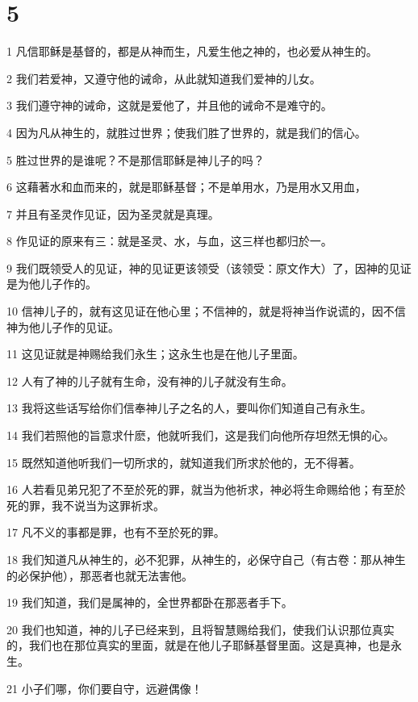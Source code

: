 \chapter{5}

\par 1 凡信耶稣是基督的，都是从神而生，凡爱生他之神的，也必爱从神生的。
\par 2 我们若爱神，又遵守他的诫命，从此就知道我们爱神的儿女。
\par 3 我们遵守神的诫命，这就是爱他了，并且他的诫命不是难守的。
\par 4 因为凡从神生的，就胜过世界；使我们胜了世界的，就是我们的信心。
\par 5 胜过世界的是谁呢？不是那信耶稣是神儿子的吗？
\par 6 这藉著水和血而来的，就是耶稣基督；不是单用水，乃是用水又用血，
\par 7 并且有圣灵作见证，因为圣灵就是真理。
\par 8 作见证的原来有三：就是圣灵、水，与血，这三样也都归於一。
\par 9 我们既领受人的见证，神的见证更该领受（该领受：原文作大）了，因神的见证是为他儿子作的。
\par 10 信神儿子的，就有这见证在他心里；不信神的，就是将神当作说谎的，因不信神为他儿子作的见证。
\par 11 这见证就是神赐给我们永生；这永生也是在他儿子里面。
\par 12 人有了神的儿子就有生命，没有神的儿子就没有生命。
\par 13 我将这些话写给你们信奉神儿子之名的人，要叫你们知道自己有永生。
\par 14 我们若照他的旨意求什麽，他就听我们，这是我们向他所存坦然无惧的心。
\par 15 既然知道他听我们一切所求的，就知道我们所求於他的，无不得著。
\par 16 人若看见弟兄犯了不至於死的罪，就当为他祈求，神必将生命赐给他；有至於死的罪，我不说当为这罪祈求。
\par 17 凡不义的事都是罪，也有不至於死的罪。
\par 18 我们知道凡从神生的，必不犯罪，从神生的，必保守自己（有古卷：那从神生的必保护他），那恶者也就无法害他。
\par 19 我们知道，我们是属神的，全世界都卧在那恶者手下。
\par 20 我们也知道，神的儿子已经来到，且将智慧赐给我们，使我们认识那位真实的，我们也在那位真实的里面，就是在他儿子耶稣基督里面。这是真神，也是永生。
\par 21 小子们哪，你们要自守，远避偶像！


